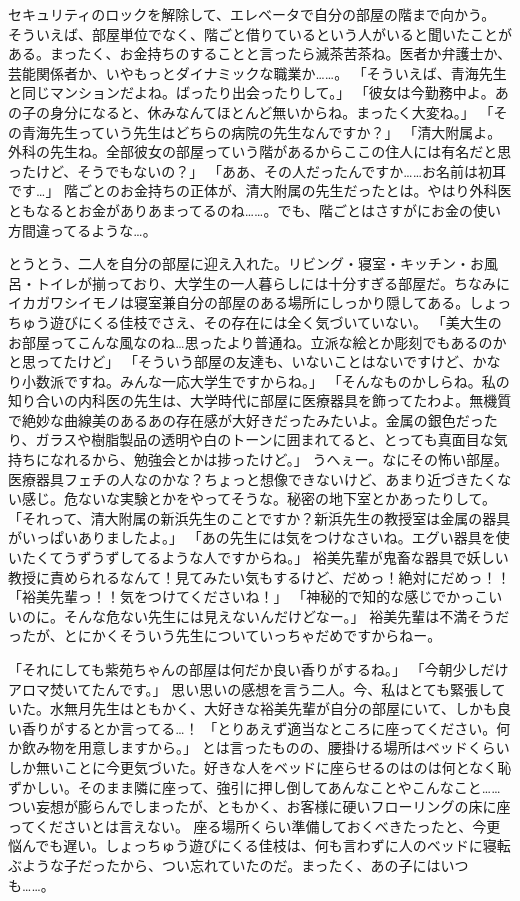 セキュリティのロックを解除して、エレベータで自分の部屋の階まで向かう。
そういえば、部屋単位でなく、階ごと借りているという人がいると聞いたことがある。まったく、お金持ちのすることと言ったら滅茶苦茶ね。医者か弁護士か、芸能関係者か、いやもっとダイナミックな職業か……。
「そういえば、青海先生と同じマンションだよね。ばったり出会ったりして。」
「彼女は今勤務中よ。あの子の身分になると、休みなんてほとんど無いからね。まったく大変ね。」
「その青海先生っていう先生はどちらの病院の先生なんですか？」
「清大附属よ。外科の先生ね。全部彼女の部屋っていう階があるからここの住人には有名だと思ったけど、そうでもないの？」
「ああ、その人だったんですか……お名前は初耳です…」
階ごとのお金持ちの正体が、清大附属の先生だったとは。やはり外科医ともなるとお金がありあまってるのね……。でも、階ごとはさすがにお金の使い方間違ってるような…。

とうとう、二人を自分の部屋に迎え入れた。リビング・寝室・キッチン・お風呂・トイレが揃っており、大学生の一人暮らしには十分すぎる部屋だ。ちなみにイカガワシイモノは寝室兼自分の部屋のある場所にしっかり隠してある。しょっちゅう遊びにくる佳枝でさえ、その存在には全く気づいていない。
「美大生のお部屋ってこんな風なのね…思ったより普通ね。立派な絵とか彫刻でもあるのかと思ってたけど」
「そういう部屋の友達も、いないことはないですけど、かなり小数派ですね。みんな一応大学生ですからね。」
「そんなものかしらね。私の知り合いの内科医の先生は、大学時代に部屋に医療器具を飾ってたわよ。無機質で絶妙な曲線美のあるあの存在感が大好きだったみたいよ。金属の銀色だったり、ガラスや樹脂製品の透明や白のトーンに囲まれてると、とっても真面目な気持ちになれるから、勉強会とかは捗ったけど。」
うへぇー。なにその怖い部屋。医療器具フェチの人なのかな？ちょっと想像できないけど、あまり近づきたくない感じ。危ないな実験とかをやってそうな。秘密の地下室とかあったりして。
「それって、清大附属の新浜先生のことですか？新浜先生の教授室は金属の器具がいっぱいありましたよ。」
「あの先生には気をつけなさいね。エグい器具を使いたくてうずうずしてるような人ですからね。」
裕美先輩が鬼畜な器具で妖しい教授に責められるなんて！見てみたい気もするけど、だめっ！絶対にだめっ！！
「裕美先輩っ！！気をつけてくださいね！」
「神秘的で知的な感じでかっこいいのに。そんな危ない先生には見えないんだけどなー。」
裕美先輩は不満そうだったが、とにかくそういう先生についていっちゃだめですからねー。

「それにしても紫苑ちゃんの部屋は何だか良い香りがするね。」
「今朝少しだけアロマ焚いてたんです。」
思い思いの感想を言う二人。今、私はとても緊張していた。水無月先生はともかく、大好きな裕美先輩が自分の部屋にいて、しかも良い香りがするとか言ってる…！
「とりあえず適当なところに座ってください。何か飲み物を用意しますから。」
とは言ったものの、腰掛ける場所はベッドくらいしか無いことに今更気づいた。好きな人をベッドに座らせるのはのは何となく恥ずかしい。そのまま隣に座って、強引に押し倒してあんなことやこんなこと……つい妄想が膨らんでしまったが、ともかく、お客様に硬いフローリングの床に座ってくださいとは言えない。
座る場所くらい準備しておくべきたったと、今更悩んでも遅い。しょっちゅう遊びにくる佳枝は、何も言わずに人のベッドに寝転ぶような子だったから、つい忘れていたのだ。まったく、あの子にはいつも……。

